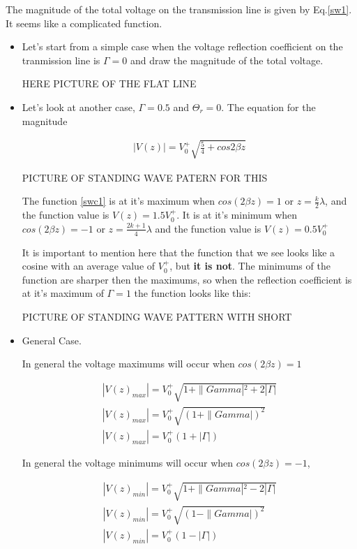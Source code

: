 The magnitude of the total voltage on the transmission line is given
by Eq.\ref{sw1}. It seems like a complicated function.

\begin{itemize}
 \item Let's start 
from a simple case when the voltage reflection coefficient on the
tranmission line is $\Gamma=0$ and draw the magnitude of the total
voltage.

HERE PICTURE OF THE FLAT LINE

\item Let's look at another case,  $\Gamma=0.5$ and $\Theta_r=0$. The
equation  for the magnitude 

\begin{eqnarray}
|V(z)|=V_0^+ \sqrt{\frac{5}{4}+ cos{2 \beta z} }\label{swc1}
\end{eqnarray}

PICTURE OF STANDING WAVE PATERN FOR THIS

The function \ref{swc1} is at it's maximum 
when $cos(2 \beta z)=1$ or $z=\frac{k}{2} \lambda$, and the function
value is $V(z)=1.5V_0^+  $. It is at it's
minimum when  $cos(2 \beta z)=-1$ or $z=\frac{2 k +1}{4} \lambda$
and the function value is $V(z)=0.5 V_0^+$

It is important to mention here that the function that we see looks
like a cosine with an average value of $ V_0^+ $, but {\bf it is not}.
The minimums of the function are sharper then the maximums, so when
the reflection coefficient is at it's maximum of $\Gamma =1$ the
function looks like this:

PICTURE OF STANDING WAVE PATTERN WITH SHORT

\item General Case. 

In general the voltage maximums will occur when
$cos(2 \beta z)=1$

\begin{eqnarray}
|V(z)_{max}|=V_0^+\sqrt{1+\|Gamma|^2+2 |\Gamma|} \nonumber  \\
|V(z)_{max}| =V_0^+\sqrt{(1+\|Gamma|)^2}  \nonumber \\
|V(z)_{max}| =V_0^+(1+|\Gamma|) 
\end{eqnarray}



In general the voltage minimums will occur when
$cos(2 \beta z)=-1$,



\begin{eqnarray}
|V(z)_{min}|=V_0^+\sqrt{1+\|Gamma|^2-2 |\Gamma|} \nonumber  \\
|V(z)_{min}| =V_0^+\sqrt{(1-\|Gamma|)^2}  \nonumber \\
|V(z)_{min}| =V_0^+ (1-|\Gamma|) 
\end{eqnarray}


\end{itemize}
